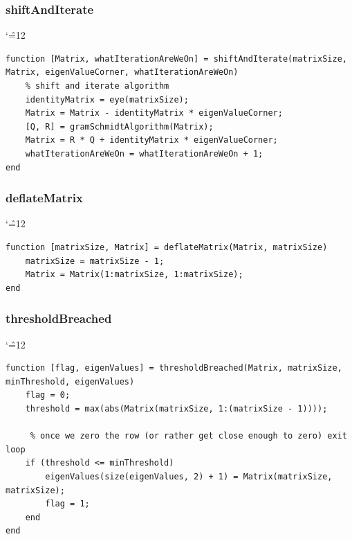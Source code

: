 \documentclass[12pt]{report}
\newenvironment{simplechar}{%
   \catcode`\^=12
}{}
\begin{document}
\subsubsection{shiftAndIterate}
\begin{simplechar}
\begin{lstlisting}
function [Matrix, whatIterationAreWeOn] = shiftAndIterate(matrixSize, Matrix, eigenValueCorner, whatIterationAreWeOn)
    % shift and iterate algorithm
    identityMatrix = eye(matrixSize);
    Matrix = Matrix - identityMatrix * eigenValueCorner;
    [Q, R] = gramSchmidtAlgorithm(Matrix);
    Matrix = R * Q + identityMatrix * eigenValueCorner;
    whatIterationAreWeOn = whatIterationAreWeOn + 1;
end

\end{lstlisting}
\end{simplechar}

\subsubsection{deflateMatrix}
\begin{simplechar}
\begin{lstlisting}
function [matrixSize, Matrix] = deflateMatrix(Matrix, matrixSize)
    matrixSize = matrixSize - 1;
    Matrix = Matrix(1:matrixSize, 1:matrixSize);
end

\end{lstlisting}
\end{simplechar}

\subsubsection{thresholdBreached}
\begin{simplechar}
\begin{lstlisting}
function [flag, eigenValues] = thresholdBreached(Matrix, matrixSize, minThreshold, eigenValues)
    flag = 0;
    threshold = max(abs(Matrix(matrixSize, 1:(matrixSize - 1))));

     % once we zero the row (or rather get close enough to zero) exit loop
    if (threshold <= minThreshold)
        eigenValues(size(eigenValues, 2) + 1) = Matrix(matrixSize, matrixSize);
        flag = 1;
    end
end
\end{lstlisting}
\end{simplechar}
\end{document}
